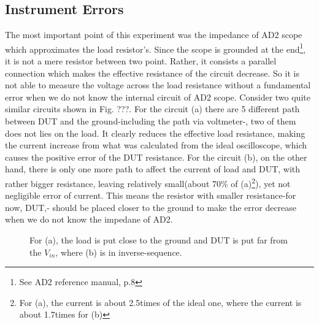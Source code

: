 \documentclass[5p,sort&compress]{elsarticle}
\begin{document}
\subsection{Instrument Errors}
The most important point of this experiment was the impedance of AD2 scope which approximates the load resistor's. Since the scope is grounded at the end\footnote{See AD2 reference manual, p.8}, it is not a mere resistor between two point. Rather, it consists a parallel connection which makes the effective resistance of the circuit decrease. So it is not able to measure the voltage across the load resistance without a fundamental error when we do not know the internal circuit of AD2 scope. Consider two quite similar circuits shown in Fig. ???. For the circuit (a) there are 5 different path between DUT and the ground-including the path via voltmeter-, two of them does not lies on the load. It clearly reduces the effective load resistance, making the current increase from what was calculated from the ideal oscilloscope, which causes the positive error of the DUT resistance. For the circuit (b), on the other hand, there is only one more path to affect the current of load and DUT, with rather bigger resistance, leaving relatively small(about 70\% of (a)\footnote{For (a), the current is about 2.5times of the ideal one, where the current is about 1.7times for (b)}), yet not negligible error of current. This means the resistor with smaller resistance-for now, DUT,- should be placed closer to the ground to make the error decrease when we do not know the impedane of AD2.
\newline
\begin{figure}[h]
    \centering
    \caption{For (a), the load is put close to the ground and DUT is put far from the $V_{in}$, where (b) is in inverse-sequence.}
    \label{fig:whatever}
\end{figure}
\end{document}
